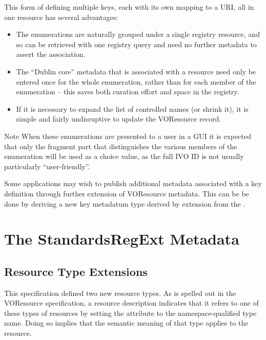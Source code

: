 \documentclass[11pt,a4paper]{ivoa}
\begin{document}
This form of defining multiple keys, each with its own mapping to a
URI, all in one resource has several advantages:



\begin{itemize}

\item  The enumerations are naturally grouped under a single registry
       resource, and so can be retrieved with one registry query and
       need no further metadata to assert the association.

\item  The ``Dublin core'' metadata that is associated with a resource
       need only be entered once for the whole enumeration, rather
       than for each member of the enumeration -- this  saves both
       curation effort and space in the registry.

\item  If it is necessary to expand the list of controlled names (or
       shrink it), it is simple and fairly undisruptive to update the
       VOResource record.

\end{itemize}

\begin{admonition}{Note}
       When these enumerations are presented to a user in a GUI it is
       expected that only the fragment part that distinguishes
       the various members of the enumeration will be used as a choice
       value, as the full IVO ID is not usually particularly
       ``user-friendly''.
\end{admonition}

Some applications may wish to publish additional metadata associated
with a key definition through further extension of VOResource
metadata.  This can be be done by deriving a new key metadatum type
derived by extension from the .



\section{The StandardsRegExt Metadata}

\subsection{Resource Type Extensions}

This specification defined two new resource types.  As is spelled
out in the VOResource specification, a resource description indicates
that it refers to one of these types of resources by setting the
 attribute to the namespace-qualified type name.
Doing so implies that the semantic meaning of that type applies to the
resource.
\end{document}
